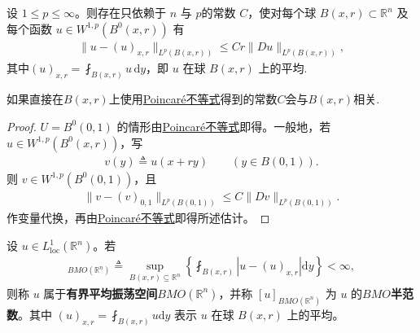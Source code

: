 \documentclass[../../main.tex]{subfiles}
\begin{document}
\begin{theorem}\label{theorem:ch05-球Poincare}
设 $1\leqslant p\leqslant\infty$。则存在只依赖于 $n$ 与 $p$的常数 $C$，使对每个球 $B(x,r)\subset\mathbb{R}^{n}$ 及每个函数 $u\in W^{1,p}(B^{0}(x,r))$ 有
\begin{align}
\|u-(u)_{x,r}\|_{L^{p}(B(x,r))}\leqslant Cr\|Du\|_{L^{p}(B(x,r))},
\end{align}
其中$(u)_{x,r}=\fint_{B(x,r)}u\,\mathrm{d}y$，即 $u$ 在球 $B(x,r)$ 上的平均.
\end{theorem}
\begin{remark}
如果直接在$B(x,r)$上使用\hyperref[theorem:ch05-Poincare]{Poincaré不等式}得到的常数$C$会与$B(x,r)$相关.
\end{remark}
\begin{proof}
$U=B^{0}(0,1)$ 的情形由\hyperref[theorem:ch05-Poincare]{Poincaré不等式}即得。一般地，若 $u\in W^{1,p}(B^{0}(x,r))$，写
\begin{align*}
v(y)\triangleq u(x+ry)\qquad (y\in B(0,1)).
\end{align*}
则 $v\in W^{1,p}(B^{0}(0,1))$，且
\begin{align*}
\|v-(v)_{0,1}\|_{L^{p}(B(0,1))}\leqslant C\|Dv\|_{L^{p}(B(0,1))}.
\end{align*}
作变量代换，再由\hyperref[theorem:ch05-Poincare]{Poincaré不等式}即得所述估计。
\end{proof}

\begin{definition}\label{definition:BMO}
设 $u\in L^1_{\mathrm{loc}}(\mathbb{R}^n)$。若
\begin{align*}
[u]_{BMO(\mathbb{R}^n)} \triangleq \sup\limits_{B(x,r)\subseteq \mathbb{R}^n} \left\{ \fint_{B(x,r)} |u - (u)_{x,r}| \mathrm{d}y \right\} < \infty,
\end{align*}
则称 $u$ 属于\textbf{有界平均振荡空间}$BMO(\mathbb{R}^n)$，并称 $[u]_{BMO(\mathbb{R}^n)}$ 为 $u$ 的\textbf{$BMO$半范数}。其中 $(u)_{x,r} = \fint_{B(x,r)} u \mathrm{d}y$ 表示 $u$ 在球 $B(x,r)$ 上的平均。
\end{definition}
\end{document}
